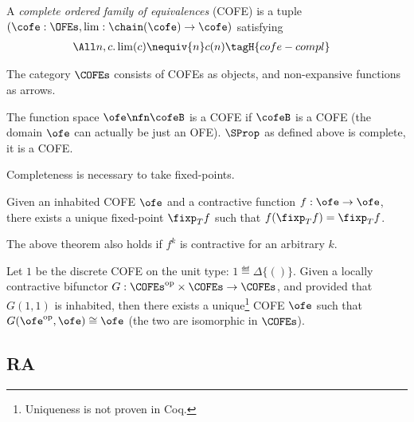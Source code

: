 \begin{defn}
  A \emph{complete ordered family of equivalences} (COFE) is a tuple $(\cofe : \OFEs,  \lim : \chain(\cofe) \to \cofe)$ satisfying
  \begin{align*}
    \All n, c.& \lim(c) \nequiv{n} c(n) \tagH{cofe-compl}
  \end{align*}
\end{defn}

\begin{defn}
  The category $\COFEs$ consists of COFEs as objects, and non-expansive functions as arrows.
\end{defn}

The function space $\ofe \nfn \cofeB$ is a COFE if $\cofeB$ is a COFE (\ie the domain $\ofe$ can actually be just an OFE).
$\SProp$ as defined above is complete, \ie it is a COFE.

Completeness is necessary to take fixed-points.

\begin{thm}
\label{thm:banach}
Given an inhabited COFE $\ofe$ and a contractive function $f : \ofe \to \ofe$, there exists a unique fixed-point $\fixp_T f$ such that $f(\fixp_T f) = \fixp_T f$.
\end{thm}

The above theorem also holds if $f^k$ is contractive for an arbitrary $k$.

\begin{thm}
\label{thm:america_rutten}
Let $1$ be the discrete COFE on the unit type: $1 \eqdef \Delta \{ () \}$.
Given a locally contractive bifunctor $G : \COFEs^{\textrm{op}} \times \COFEs \to \COFEs$, and provided that \(G(1, 1)\) is inhabited,
then there exists a unique\footnote{Uniqueness is not proven in Coq.} COFE $\ofe$ such that $G(\ofe^{\textrm{op}}, \ofe) \cong \ofe$ (\ie the two are isomorphic in $\COFEs$).
\end{thm}

\subsection{RA}

